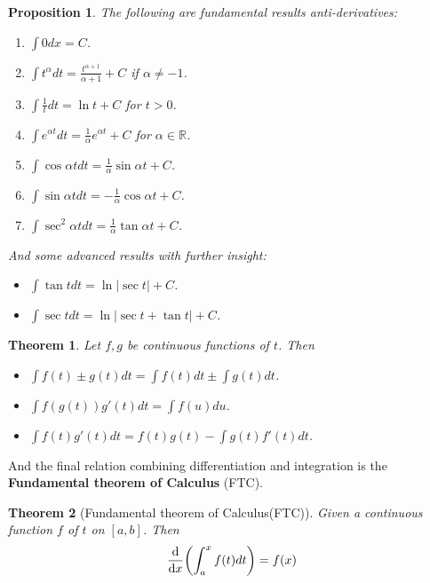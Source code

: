 \documentclass[12pt]{article}
\newtheorem*{theorem}{Theorem}
\newtheorem*{proposition}{Proposition}
\begin{document}
    \begin{proposition}
        The following are fundamental results anti-derivatives:\begin{enumerate}
            \item $\int 0 dx = C$.
            \item $\int t^{\alpha} dt = \frac{t^{\alpha+1}}{\alpha+1} + C$ if $\alpha\neq -1$.
            \item $\int \frac{1}{t} dt = \ln{t} + C$ for $t > 0$.
            \item $\int e^{\alpha t} dt = \frac{1}{\alpha}e^{\alpha t} + C$ for $\alpha\in \mathbb{R}$.
            \item $\int \cos{\alpha t} dt = \frac{1}{\alpha}\sin{\alpha t} + C$.
            \item $\int \sin{\alpha t} dt = -\frac{1}{\alpha}\cos{\alpha t} + C$.
            \item $\int \sec^2{\alpha t} dt = \frac{1}{\alpha}\tan{\alpha t} + C$.
        \end{enumerate}
        And some advanced results with further insight:\begin{itemize}
            \item $\int \tan{t} dt = \ln|\sec{t}| + C$.
            \item $\int \sec{t} dt = \ln|\sec{t} + \tan{t}| + C$.
        \end{itemize}
    \end{proposition}

    \begin{theorem}
        Let $f,g$ be continuous functions of $t$. Then \begin{itemize}
            \item $\int f(t)\pm g(t) dt = \int f(t) dt \pm \int g(t) dt$.
            \item $\int f(g(t))g'(t) dt = \int f(u) du$.
            \item $\int f(t)g'(t) dt = f(t)g(t) - \int g(t)f'(t) dt$.
        \end{itemize}
    \end{theorem}

    And the final relation combining differentiation and integration is the \textbf{Fundamental theorem of Calculus} (FTC).

    \begin{theorem}[Fundamental theorem of Calculus(FTC)]
        Given a continuous function $f$ of $t$ on $[a,b]$. Then \[\derivative{x}(\int_{a}^{x} f(t) dt) = f(x)\]
    \end{theorem}
\end{document}
